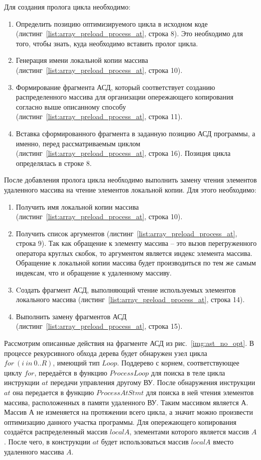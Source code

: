\noindent Для создания пролога цикла необходимо:
\begin{enumerate}
	\item Определить позицию оптимизируемого цикла в исходном коде 
(листинг~\ref{list:array_preload_process_at}, строка 8). Это необходимо для 
того, чтобы знать, куда необходимо вставить пролог цикла.
	\item Генерация имени локальной копии массива 
(листинг~\ref{list:array_preload_process_at}, строка 10).
	\item Формирование фрагмента АСД, который соответствует созданию 
распределенного массива для организации опережающего копирования согласно выше 
описанному способу (листинг~\ref{list:array_preload_process_at}, строка 11).
	\item Вставка сформированного фрагмента в заданную позицию АСД программы, а 
именно, перед рассматриваемым циклом 
(листинг~\ref{list:array_preload_process_at}, строка 16). Позиция цикла 
определялась в строке 8.
\end{enumerate}

\noindent После добавления пролога цикла необходимо выполнить замену чтения 
элементов удаленного массива на чтение элементов локальной копии. Для этого 
необходимо: 
\begin{enumerate}
	\item Получить имя локальной копии массива 
(листинг~\ref{list:array_preload_process_at}, строка 10).
	\item Получить список аргументов (листинг~\ref{list:array_preload_process_at}, 
строка 9). Так как обращение к элементу массива -- это вызов перегруженного 
оператора круглых скобок, то аргументом является индекс элемента массива. 
Обращение к локальной копии массива будет производиться по тем же самым 
индексам, что и обращение к удаленному массиву.
	\item Cоздать фрагмент АСД, выполняющий чтение используемых элементов 
локального массива (листинг~\ref{list:array_preload_process_at}, строка 14).
	\item Выполнить замену фрагментов АСД 
(листинг~\ref{list:array_preload_process_at}, строка 15).
\end{enumerate}

Рассмотрим описанные действия на фрагменте АСД из рис.~\ref{img:ast_no_opt}. В 
процессе рекурсивного обхода дерева будет обнаружен узел цикла $for\ (i\ in\ 
0..R)$, имеющий тип $Loop$. Поддерево с корнем, соответствующее циклу $for$, 
передаётся в функцию $ProcessLoop$ для поиска в теле цикла инструкции $at$ 
передачи управления другому ВУ. После обнаружения инструкции $at$ она передается 
в функцию $ProcessAtStmt$ для поиска в ней чтения элементов массива, 
расположенных в памяти удаленного ВУ. Таким массивом является $А$. Массив $А$ не 
изменяется на протяжении всего цикла, а значит можно произвести оптимизацию 
данного участка программы. Для опережающего копирования создаётся распределенный 
массив $localA$, элементами которого является массив $A$. После чего, в 
конструкции $at$ будет использоваться массив $localA$ вместо удаленного массива 
$A$. 

